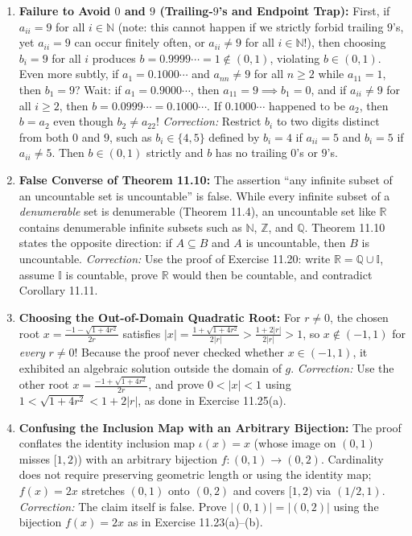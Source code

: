 \documentclass[11pt, letterpaper]{article}
\theoremstyle{definition}
\theoremstyle{remark}
\begin{document}
\begin{enumerate}[label=\textbf{Flaw \arabic*:}]
    \item \textbf{Failure to Avoid $0$ and $9$ (Trailing-$9$'s and Endpoint Trap):}
    First, if $a_{ii} = 9$ for all $i \in \mathbb{N}$ (note: this cannot happen if we strictly forbid trailing $9$'s, yet $a_{ii} = 9$ can occur finitely often, or $a_{ii} \neq 9$ for all $i \in \mathbb{N}$!), then choosing $b_i = 9$ for all $i$ produces $b = 0.9999\cdots = 1 \notin (0, 1)$, violating $b \in (0, 1)$. Even more subtly, if $a_1 = 0.1000\cdots$ and $a_{nn} \neq 9$ for all $n \ge 2$ while $a_{11} = 1$, then $b_1 = 9$? Wait: if $a_1 = 0.9000\cdots$, then $a_{11} = 9 \implies b_1 = 0$, and if $a_{ii} \neq 9$ for all $i \ge 2$, then $b = 0.0999\cdots = 0.1000\cdots$. If $0.1000\cdots$ happened to be $a_2$, then $b = a_2$ even though $b_2 \neq a_{22}$!
    \emph{Correction:} Restrict $b_i$ to two digits distinct from both $0$ and $9$, such as $b_i \in \{4, 5\}$ defined by $b_i = 4$ if $a_{ii} = 5$ and $b_i = 5$ if $a_{ii} \neq 5$. Then $b \in (0, 1)$ strictly and $b$ has no trailing $0$'s or $9$'s.

    \item \textbf{False Converse of Theorem 11.10:}
    The assertion ``any infinite subset of an uncountable set is uncountable'' is false. While every infinite subset of a \emph{denumerable} set is denumerable (Theorem 11.4), an uncountable set like $\mathbb{R}$ contains denumerable infinite subsets such as $\mathbb{N}$, $\mathbb{Z}$, and $\mathbb{Q}$. Theorem 11.10 states the opposite direction: if $A \subseteq B$ and $A$ is uncountable, then $B$ is uncountable.
    \emph{Correction:} Use the proof of Exercise 11.20: write $\mathbb{R} = \mathbb{Q} \cup \mathbb{I}$, assume $\mathbb{I}$ is countable, prove $\mathbb{R}$ would then be countable, and contradict Corollary 11.11.

    \item \textbf{Choosing the Out-of-Domain Quadratic Root:}
    For $r \neq 0$, the chosen root $x = \frac{-1 - \sqrt{1 + 4r^2}}{2r}$ satisfies $|x| = \frac{1 + \sqrt{1 + 4r^2}}{2|r|} > \frac{1 + 2|r|}{2|r|} > 1$, so $x \notin (-1, 1)$ for \emph{every} $r \neq 0$! Because the proof never checked whether $x \in (-1, 1)$, it exhibited an algebraic solution outside the domain of $g$.
    \emph{Correction:} Use the other root $x = \frac{-1 + \sqrt{1 + 4r^2}}{2r}$, and prove $0 < |x| < 1$ using $1 < \sqrt{1 + 4r^2} < 1 + 2|r|$, as done in Exercise 11.25(a).

    \item \textbf{Confusing the Inclusion Map with an Arbitrary Bijection:}
    The proof conflates the identity inclusion map $\iota(x) = x$ (whose image on $(0, 1)$ misses $[1, 2)$) with an arbitrary bijection $f : (0, 1) \to (0, 2)$. Cardinality does not require preserving geometric length or using the identity map; $f(x) = 2x$ stretches $(0, 1)$ onto $(0, 2)$ and covers $[1, 2)$ via $(1/2, 1)$.
    \emph{Correction:} The claim itself is false. Prove $|(0, 1)| = |(0, 2)|$ using the bijection $f(x) = 2x$ as in Exercise 11.23(a)--(b).


\end{enumerate}
\end{document}
